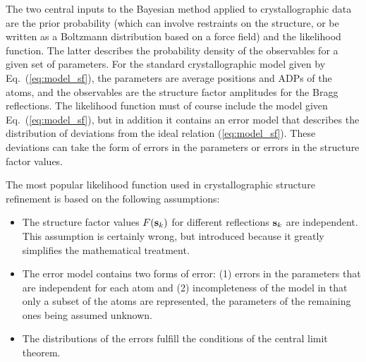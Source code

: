 \documentclass[12pt]{article}
\newcommand{\vect}[1]{{\bf #1}}
\newcommand{\vs}{\vect{s}}
\begin{document}
\begin{sloppy}
The two central inputs to the Bayesian method applied to
crystallographic data are the prior probability (which can involve
restraints on the structure, or be written as a Boltzmann distribution
based on a force field) and the likelihood function. The latter
describes the probability density of the observables for a given set
of parameters. For the standard crystallographic model given by
Eq.~(\ref{eq:model_sf}), the parameters are average positions and ADPs
of the atoms, and the observables are the structure factor amplitudes
for the Bragg reflections. The likelihood function must of course
include the model given Eq.~(\ref{eq:model_sf}), but in addition it
contains an error model that describes the distribution of deviations
from the ideal relation (\ref{eq:model_sf}). These deviations can take
the form of errors in the parameters or errors in the structure factor
values.

The most popular likelihood function used in crystallographic structure
refinement is based on the following assumptions:
\begin{itemize}
\item The structure factor values $F(\vs_k)$ for different reflections
  $\vs_k$ are independent. This assumption is certainly wrong, but
  introduced because it greatly simplifies the mathematical treatment.
\item The error model contains two forms of error: (1) errors in the
  parameters that are independent for each atom and (2) incompleteness
  of the model in that only a subset of the atoms are represented,
  the parameters of the remaining ones being assumed unknown.
\item The distributions of the errors fulfill the conditions of the
  central limit theorem.
\end{itemize}


\end{sloppy}
\end{document}
